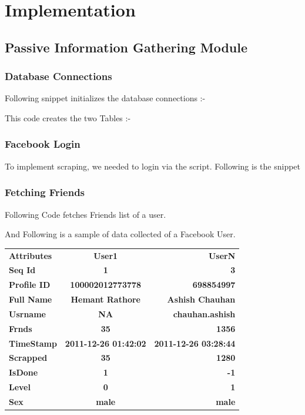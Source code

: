 \chapter{Implementation}

\section{Passive Information Gathering Module}

\subsection{Database Connections}
Following snippet initializes the database connections :-


This code creates the two Tables :-


\subsection{Facebook Login}
To implement scraping, we needed to login via the script. Following is the snippet 


\subsection{Fetching Friends}

Following Code fetches Friends list of a user.

And Following is a sample of data collected of a Facebook User.\\
\begin{table}[h]
\centering
\begin{tabular}{>{\bfseries}l>{\bfseries}c>{\bfseries}r}
Attributes	& 	User1 			& UserN\\
Seq Id		& 	1 			& 3\\
Profile ID      & 	100002012773778 	& 698854997\\
Full Name	& 	Hemant Rathore		& Ashish Chauhan\\
Usrname 	& 	NA			& chauhan.ashish\\
Frnds           &	35			& 1356\\
TimeStamp 	&	2011-12-26 01:42:02	& 2011-12-26 03:28:44\\
Scrapped 	&	35			& 1280\\
IsDone 		& 	1 			& -1\\
Level    	& 	0  			& 1\\
Sex		& 	male 			& male\\
\end{tabular}
\end{table}

